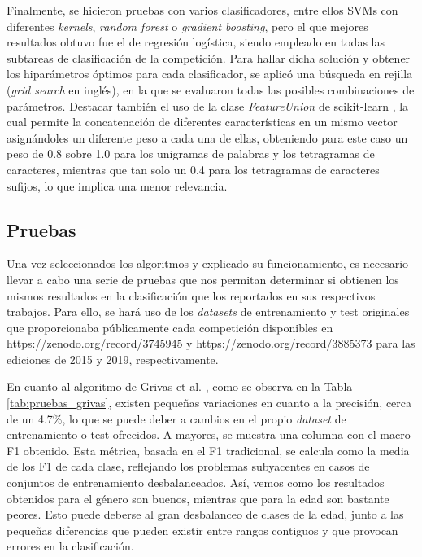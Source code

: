 Finalmente, se hicieron pruebas con varios clasificadores, entre ellos SVMs con diferentes \textit{kernels}, \textit{random forest} o \textit{gradient boosting}, pero el que mejores resultados
obtuvo fue el de regresión logística, siendo empleado en todas las subtareas de clasificación de la competición. Para hallar dicha solución y obtener los hiparámetros óptimos para cada
clasificador, se aplicó una búsqueda en rejilla (\textit{grid search} en inglés), en la que se evaluaron todas las posibles combinaciones de parámetros.
Destacar también el uso de la clase \textit{FeatureUnion} de scikit-learn \cite{scikitlearn}, la cual permite la concatenación de diferentes características en un mismo vector asignándoles
un diferente peso a cada una de ellas, obteniendo para este caso un peso de 0.8 sobre 1.0 para los unigramas de palabras y los tetragramas de caracteres, mientras que tan solo un 0.4 para los tetragramas de caracteres sufijos,
lo que implica una menor relevancia.

\subsection{Pruebas}

Una vez seleccionados los algoritmos y explicado su funcionamiento, es necesario llevar a cabo una serie de pruebas que nos permitan determinar
si obtienen los mismos resultados en la clasificación que los reportados en sus respectivos trabajos.
Para ello, se hará uso de los \textit{datasets} de entrenamiento y test originales que proporcionaba públicamente cada competición disponibles
en \url{https://zenodo.org/record/3745945} y \url{https://zenodo.org/record/3885373} para las ediciones de 2015 y 2019, respectivamente.

\bigskip
En cuanto al algoritmo de Grivas et al. \cite{grivas2015author}, como se observa en la Tabla \ref{tab:pruebas_grivas}, existen pequeñas variaciones en
cuanto a la precisión, cerca de un 4.7\%, lo que se puede deber a cambios en el propio \textit{dataset} de entrenamiento o test ofrecidos. A mayores,
se muestra una columna con el macro F1 obtenido. Esta métrica, basada en el F1 tradicional, se calcula como la media de los F1 de cada clase,
reflejando los problemas subyacentes en casos de conjuntos de entrenamiento desbalanceados.
Así, vemos como los resultados obtenidos para el género son buenos, mientras que para la edad son bastante peores. Esto puede deberse al gran
desbalanceo de clases de la edad, junto a las pequeñas diferencias que pueden existir entre rangos contiguos y que provocan errores en la clasificación.

